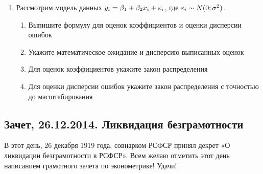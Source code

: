\documentclass[12pt, a4paper]{article}
\begin{document}
\begin{enumerate}
\item Рассмотрим модель данных $y_i=\beta_1 + \beta_2 x_i + \varepsilon_i$, где $\varepsilon_i \sim N(0;\sigma^2)$.
\begin{enumerate}
\item Выпишите формулу для оценок коэффициентов и оценки дисперсии ошибок
\item Укажите математическое ожидание и дисперсию выписанных оценок
\item Для оценок коэффициентов укажите закон распределения
\item Для оценки дисперсии ошибок укажите закон распределения с точностью до масштабирования
\end{enumerate}

\end{enumerate}

\subsection{Зачет, 26.12.2014. Ликвидация безграмотности}

В этот день, 26 декабря 1919 года, совнарком РСФСР принял декрет «О ликвидации безграмотности в РСФСР». Всем желаю отметить этот день написанием грамотного зачета по эконометрике! Удачи!
\end{document}
